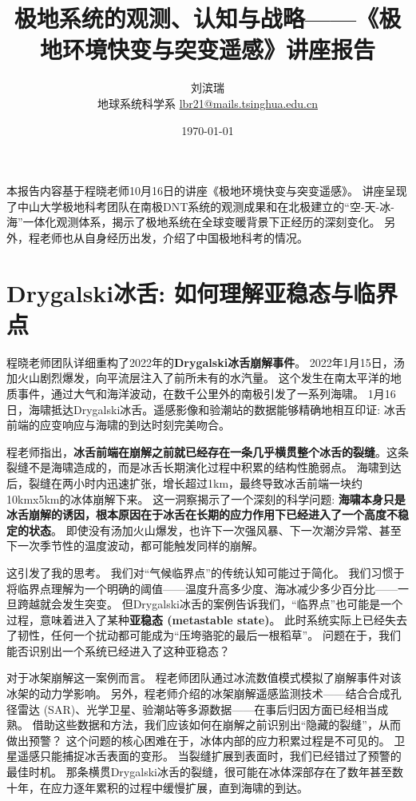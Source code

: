 \documentclass[12pt, a4paper]{article}
\title{{\large{\textbf{极地系统的观测、认知与战略——《极地环境快变与突变遥感》讲座报告}}}}
\author{刘滨瑞 \\ 地球系统科学系 \quad \href{mailto:lbr21@mails.tsinghua.edu.cn}{lbr21@mails.tsinghua.edu.cn}}
\date{\today}
\begin{document}
\maketitle



本报告内容基于程晓老师10月16日的讲座《极地环境快变与突变遥感》。
讲座呈现了中山大学极地科考团队在南极DNT系统的观测成果和在北极建立的“空-天-冰-海”一体化观测体系，揭示了极地系统在全球变暖背景下正经历的深刻变化。
另外，程老师也从自身经历出发，介绍了中国极地科考的情况。



\section{Drygalski冰舌: 如何理解亚稳态与临界点}

程晓老师团队详细重构了2022年的\textbf{Drygalski冰舌崩解事件}。
2022年1月15日，汤加火山剧烈爆发，向平流层注入了前所未有的水汽量。
这个发生在南太平洋的地质事件，通过大气和海洋波动，在数千公里外的南极引发了一系列海啸。
1月16日，海啸抵达Drygalski冰舌。遥感影像和验潮站的数据能够精确地相互印证: 冰舌前端的应变响应与海啸的到达时刻完美吻合。

程老师指出，\textbf{冰舌前端在崩解之前就已经存在一条几乎横贯整个冰舌的裂缝}。这条裂缝不是海啸造成的，而是冰舌长期演化过程中积累的结构性脆弱点。
海啸到达后，裂缝在两小时内迅速扩张，增长超过1km，最终导致冰舌前端一块约10kmx5km的冰体崩解下来。
这一洞察揭示了一个深刻的科学问题: \textbf{海啸本身只是冰舌崩解的诱因，根本原因在于冰舌在长期的应力作用下已经进入了一个高度不稳定的状态}。
即使没有汤加火山爆发，也许下一次强风暴、下一次潮汐异常、甚至下一次季节性的温度波动，都可能触发同样的崩解。

这引发了我的思考。
我们对“气候临界点”的传统认知可能过于简化。
我们习惯于将临界点理解为一个明确的阈值——温度升高多少度、海冰减少多少百分比——一旦跨越就会发生突变。
但Drygalski冰舌的案例告诉我们，“临界点”也可能是一个过程，意味着进入了某种\textbf{亚稳态 (metastable state)}。
此时系统实际上已经失去了韧性，任何一个扰动都可能成为“压垮骆驼的最后一根稻草”。
问题在于，我们能否识别出一个系统已经进入了这种亚稳态？

对于冰架崩解这一案例而言。
程老师团队通过冰流数值模式模拟了崩解事件对该冰架的动力学影响。
另外，程老师介绍的冰架崩解遥感监测技术——结合合成孔径雷达 (SAR)、光学卫星、验潮站等多源数据——在事后归因方面已经相当成熟。
借助这些数据和方法，我们应该如何在崩解之前识别出“隐藏的裂缝”，从而做出预警？
这个问题的核心困难在于，冰体内部的应力积累过程是不可见的。
卫星遥感只能捕捉冰舌表面的变形。
当裂缝扩展到表面时，我们已经错过了预警的最佳时机。
那条横贯Drygalski冰舌的裂缝，很可能在冰体深部存在了数年甚至数十年，在应力逐年累积的过程中缓慢扩展，直到海啸的到达。
\end{document}
